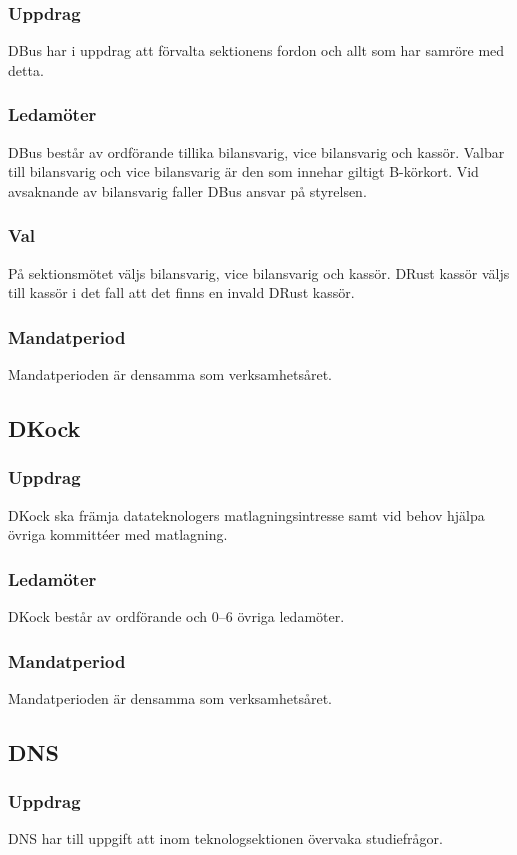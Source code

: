 \subsubsection{Uppdrag}
DBus har i uppdrag att förvalta sektionens fordon och allt som har samröre med detta.
\subsubsection{Ledamöter}
DBus består av ordförande tillika bilansvarig, vice bilansvarig och kassör. 
Valbar till bilansvarig och vice bilansvarig är den som innehar giltigt B-körkort. 
Vid avsaknande av bilansvarig faller DBus ansvar på styrelsen.
\subsubsection{Val}
På sektionsmötet väljs bilansvarig, vice bilansvarig och kassör. 
DRust kassör väljs till kassör i det fall att det finns en invald DRust kassör. 
\subsubsection{Mandatperiod}
Mandatperioden är densamma som verksamhetsåret.

\subsection{DKock}
\subsubsection{Uppdrag}
DKock ska främja datateknologers matlagningsintresse samt vid behov hjälpa övriga kommittéer med matlagning.
\subsubsection{Ledamöter}
DKock består av ordförande och 0--6 övriga ledamöter. 
\subsubsection{Mandatperiod}
Mandatperioden är densamma som verksamhetsåret.

\subsection{DNS}
\subsubsection{Uppdrag}
DNS har till uppgift att inom teknologsektionen övervaka studiefrågor.
